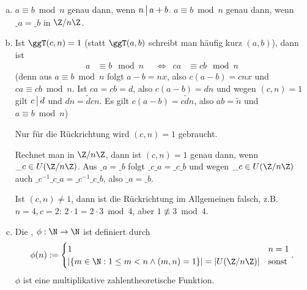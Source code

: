 \begin{nt}
	\begin{enumerate}[a)]
		\item
			$a \equiv b \bmod n$ genau dann, wenn $n \divs a + b$.
			$a \equiv b \bmod n$ genau dann, wenn $\_a = \_b$ in $\Z / n\Z$.
		\item
			Ist $\ggT(c, n) = 1$ (statt $\ggT(a,b)$ schreibt man häufig kurz $(a,b)$), dann ist
			\begin{align*}
				a &\equiv b \mod n &
				&\iff&
				ca &\equiv cb \mod n
			\end{align*}
			(denn aus $a \equiv b \bmod n$ folgt $a -b = n x$, also $c(a-b) = cnx$ und $ca \equiv cb \bmod n$.
			Ist $ca = cb = d$, also $c(a-b) = dn$ und wegen $(c,n) = 1$ gilt $c\divs d$ und $dn = \tilde d c n$.
			Es gilt $c(a-b) = c \tilde d n$, also $ab = \tilde n$ und $a \equiv b \bmod n$)

			Nur für die Rückrichtung wird $(c,n) = 1$ gebraucht.

			Rechnet man in $\Z / n \Z$, dann ist $(c,n) = 1$ genau dann, wenn $\_c \in U(\Z / n \Z)$.
			Aus $\_a = \_b$ folgt $\_c \_a = \_c \_b$ und wegen $\_c \in U(\Z / n\Z)$ auch $\_c^{-1} \_c \_a = \_c^{-1} \_c \_b$, also $\_a = \_b$.

			Ist $(c, n) \neq 1$, dann ist die Rückrichtung im Allgemeinen falsch, z.B. $n = 4, c = 2$: $2 \cdot 1 = 2 \cdot 3 \bmod 4$, aber $1 \not\equiv 3 \bmod 4$.
		\item
			Die , $\phi: \N \to \N$ ist definiert durch
			\[
				\phi(n) := \begin{cases}
					1 & n = 1 \\
					| \{m \in \N : 1 \le m < n \land (m,n) = 1 \} | = |U(\Z / n\Z)| & \text{sonst}
				\end{cases}.
			\]
			$\phi$ ist eine multiplikative zahlentheoretische Funktion.
	\end{enumerate}
\end{nt}


